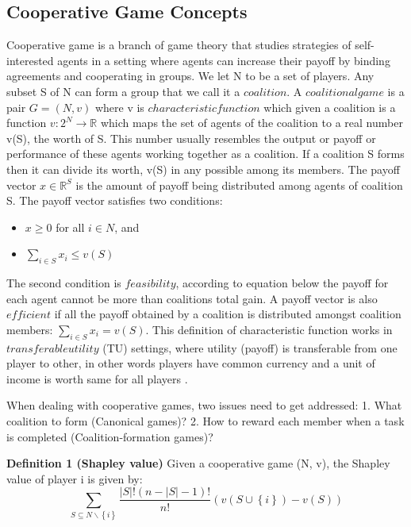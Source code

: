 \documentclass[10pt, conference, compsocconf]{IEEEtran}
\theoremstyle{plain}
\theoremstyle{definition}
\begin{document}
\subsection{Cooperative Game Concepts}
Cooperative game is a branch of game theory that studies strategies of self-interested agents in a setting where agents can increase their payoff by binding agreements and cooperating in groups. We let N to be a set of players. Any subset S of N can form a group that we call it a $coalition$. A $coalitional game$ is a pair $G = (N, v)$ where v is $characteristic function$ which given a coalition is a function $v: 2^N \to \mathbb{R}$ which maps the set of agents of the coalition to a real number v(S), the worth of S. This number usually resembles the output or payoff or performance of these agents working together as a coalition.  If a coalition S forms then it can divide its worth, v(S) in any possible among its members. The payoff vector $x \in \mathbb{R}^S$ is the amount of payoff being distributed among agents of coalition S. The payoff vector satisfies two conditions:

\begin{itemize}
	\item $x \geq 0$ for all $i \in N$, and
	\item $\sum_{i \in S} x_i \leq v(S)$
\end{itemize}

The second condition is $feasibility$, according to equation below the payoff for each agent cannot be more than coalitions total gain. A payoff vector is also $efficient$ if all the payoff obtained by a coalition is distributed amongst coalition members: $\sum_{i \in S} x_i = v(S)$. This definition of characteristic function works in $transferable utility$ (TU) settings, where utility (payoff) is transferable from one player to other, in other words players have common currency and a unit of income is worth same for all players \cite{myerson1991game}.

When dealing with cooperative games, two issues need to get addressed: 1. What coalition to form (Canonical games)? 2. How to reward each member when a task is completed (Coalition-formation games)?


{\bf Definition 1 (Shapley value)} Given a cooperative game (N, v), the Shapley value of player i is given by\cite{shapley_value}: 
\begin{equation}\label{eq:shapley}
\sum_{S \subseteq N \backslash \left\{i\right\} } \frac{|S|! (n-|S|-1)!}{n!} (v(S \cup \left\{i\right\}) - v(S))
\end{equation}
\end{document}
